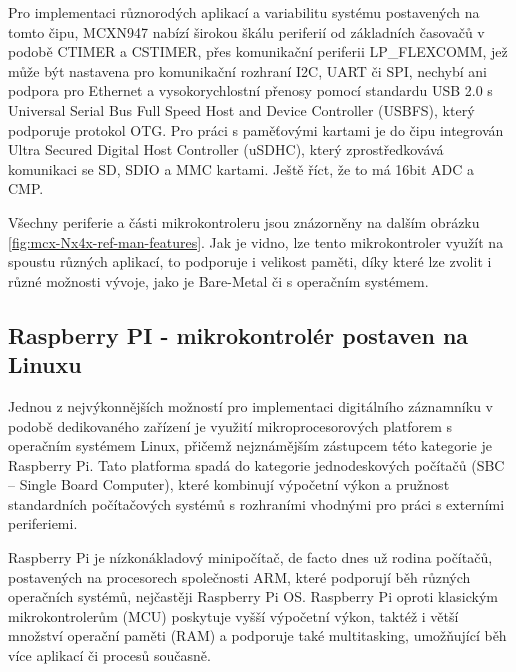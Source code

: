 Pro implementaci různorodých aplikací a variabilitu systému postavených na tomto čipu, MCXN947 nabízí širokou škálu periferií od základních časovačů v podobě CTIMER a CSTIMER, přes komunikační periferii LP\_FLEXCOMM, jež může být nastavena pro komunikační rozhraní I2C, UART či SPI, nechybí ani podpora pro Ethernet a vysokorychlostní přenosy pomocí standardu USB 2.0 s Universal Serial Bus Full Speed Host and Device Controller (USBFS), který podporuje protokol OTG. Pro práci s paměťovými kartami je do čipu integrován Ultra Secured Digital Host Controller (uSDHC), který zprostředkovává komunikaci se SD, SDIO a MMC kartami. Ještě říct, že to má 16bit ADC a CMP. \cite{nxp_MCX_Nx4x_Reference_Manual}

Všechny periferie a části mikrokontroleru jsou znázorněny na dalším obrázku \ref{fig:mcx-Nx4x-ref-man-features}. Jak je vidno, lze tento mikrokontroler využít na spoustu různých aplikací, to podporuje i velikost paměti, díky které lze zvolit i různé možnosti vývoje, jako je Bare-Metal či s operačním systémem. 

%    

\subsection{Raspberry PI - mikrokontrolér postaven na Linuxu}
Jednou z nejvýkonnějších možností pro implementaci digitálního záznamníku v podobě dedikovaného zařízení je využití mikroprocesorových platforem s operačním systémem Linux, přičemž nejznámějším zástupcem této kategorie je Raspberry Pi. Tato platforma spadá do kategorie jednodeskových počítačů (SBC – Single Board Computer), které kombinují výpočetní výkon a pružnost standardních počítačových systémů s rozhraními vhodnými pro práci s externími periferiemi.

Raspberry Pi je nízkonákladový minipočítač, de facto dnes už rodina počítačů, postavených na procesorech společnosti ARM, které podporují běh různých operačních systémů, nejčastěji Raspberry Pi OS. Raspberry Pi oproti klasickým mikrokontrolerům (MCU) poskytuje vyšší výpočetní výkon, taktéž i větší množství operační paměti (RAM) a podporuje také multitasking, umožňující běh více aplikací či procesů současně.

